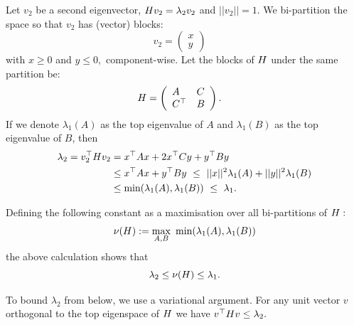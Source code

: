 Let $v_2$ be a second eigenvector, $ H v_2 = \lambda_2 v_2 $ 
and $||v_2||=1$.
We bi-partition the space 
so that $v_2$ has (vector) blocks:
$$
v_2 = \left( \begin{array}{l}
x\\
y\end{array} \right)\quad
$$
with $x\ge 0$ and $y\le 0,$ component-wise.
Let the blocks of $H$ under the same partition be:
$$
H = \left( \begin{array}{ll}
A&C\\
C^\top&B\end{array} \right).\quad
$$
If we denote $\lambda_1(A)$ as the top eigenvalue of $A$ and
$\lambda_1(B)$ as the top eigenvalue of $B$,
then
\begin{align*}
\lambda_2 = v_2^\top H v_2 &= x^\top A x + 2 x^\top C y + y^\top B y \\
        &\le x^\top A x + y^\top B y\ \le\ ||x||^2 \lambda_1(A) + ||y||^2 \lambda_1(B) \\
        &\le \mbox{min}(\lambda_1(A), \lambda_1(B))\ \le\ \lambda_1.
\end{align*}

Defining the following constant as a maximisation over
all bi-partitions of $H:$
$$
    \nu(\Ham) := \max_{A, B}\ \mbox{min}(\lambda_1(A), \lambda_1(B))
$$
the above calculation shows that
$$
    \lambda_2 \le \nu(H) \le \lambda_1.
$$

To bound $\lambda_2$ from below, we use a variational argument.
For any unit vector $v$ orthogonal to the top eigenspace of $H$ we
have $v^\top H v \le \lambda_2.$


%

%
%
%

